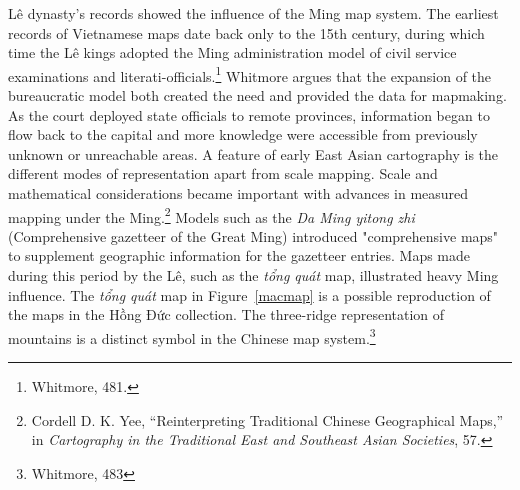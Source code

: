 Lê dynasty's records showed the influence of the Ming map system. The earliest records of Vietnamese maps date back only to the 15th century, during which time the Lê kings adopted the Ming administration model of civil service examinations and literati-officials.\footnote{Whitmore, 481.} Whitmore argues that the expansion of the bureaucratic model both created the need and provided the data for mapmaking. As the court deployed state officials to remote provinces, information began to flow back to the capital and more knowledge were accessible from previously unknown or unreachable areas. A feature of early East Asian cartography is the different modes of representation apart from scale mapping. Scale and mathematical considerations became important with advances in measured mapping under the Ming.\footnote{Cordell D. K. Yee, “Reinterpreting Traditional Chinese Geographical Maps,” in \textit{Cartography in the Traditional East and Southeast Asian Societies}, 57.} Models such as the \textit{Da Ming yitong zhi} (Comprehensive gazetteer of the Great Ming) introduced "comprehensive maps" to supplement geographic information for the gazetteer entries. Maps made during this period by the Lê, such as the \textit{tổng quát} map, illustrated heavy Ming influence. The \textit{tổng quát} map in Figure~\ref{macmap} is a possible reproduction of the maps in the Hồng Đức collection. The three-ridge representation of mountains is a distinct symbol in the Chinese map system.\footnote{Whitmore, 483}

\en
\begin{figure}[!ht]
\end{figure}

